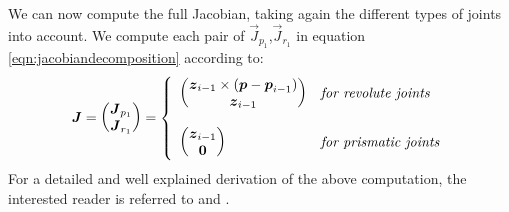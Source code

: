We can now compute the full Jacobian, taking again the different types of joints into account. We compute each pair of $\vec{J}_{p_{1}}$,$\vec{J}_{r_{1}}$ in equation \ref{eqn:jacobiandecomposition} according to:
\begin{equation}
\vec{J} = 
\begin{pmatrix}
\vec{J}_{p_{1}} \\
\vec{J}_{r_{1}}
\end{pmatrix}=\left\{
\begin{array}{l l}
\begin{pmatrix}
\vec{z}_{i-1} \times (\vec{p}-\vec{p}_{i-1}) \\
\vec{z}_{i-1}
\end{pmatrix} & \textit{for revolute joints} \\[1.7em]
\begin{pmatrix}
\vec{z}_{i-1} \\
\vec{0}
\end{pmatrix} & \textit{for prismatic joints}
\end{array} \right.
\end{equation}
For a detailed and well explained derivation of the above computation, the interested reader is referred to \cite{citeulike:1090825} and \cite{opac-b1129198}. 

